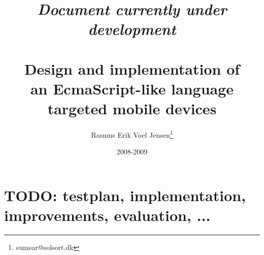 \documentclass[12pt]{report}
\title{
\emph{Document currently under development} \\ ~ \\
Design and implementation of \\ 
an EcmaScript-like language \\ 
targeted mobile devices}
\author{
  Rasmus Erik Voel Jensen\footnote{
    sumsar@solsort.dk
  }
}
\date{2008-2009}
\begin{document}

\maketitle
\begin{abstract}
\end{abstract}

\setcounter{tocdepth}{1}
\tableofcontents
\listoffigures
\nocite{sicp}





\chapter{TODO: testplan, implementation, improvements, evaluation, ...}

\newpage
{}



\appendix

\newpage
{}
\printindex
\end{document}
